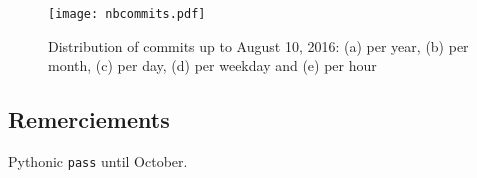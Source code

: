 \begin{figure}[htbp]
\centering
\texttt{[image: nbcommits.pdf]}
\caption{Distribution of commits up to August 10, 2016: (a) per year, (b) per month, (c) per day, (d) per weekday and (e) per hour} \label{fig:nbcommits}
\end{figure}

\subsection*{Remerciements}
Pythonic \texttt{pass} until October.
